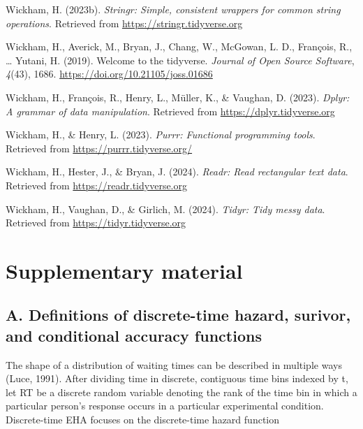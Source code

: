 \documentclass[
  man,floatsintext]{apa6}
\newlength{\cslhangindent}
\newenvironment{CSLReferences}[2] %
 {\begin{list}{}{%
  \setlength{\itemindent}{0pt}
  \setlength{\leftmargin}{0pt}
  \setlength{\parsep}{0pt}
  \ifodd #1
   \setlength{\leftmargin}{\cslhangindent}
   \setlength{\itemindent}{-1\cslhangindent}
  \fi
  \setlength{\itemsep}{#2\baselineskip}}}
 {\end{list}}
\begin{document}
\begin{CSLReferences}{1}{0}
Wickham, H. (2023b). \emph{Stringr: Simple, consistent wrappers for common string operations}. Retrieved from \url{https://stringr.tidyverse.org}

Wickham, H., Averick, M., Bryan, J., Chang, W., McGowan, L. D., François, R., \ldots{} Yutani, H. (2019). Welcome to the {tidyverse}. \emph{Journal of Open Source Software}, \emph{4}(43), 1686. \url{https://doi.org/10.21105/joss.01686}

Wickham, H., François, R., Henry, L., Müller, K., \& Vaughan, D. (2023). \emph{Dplyr: A grammar of data manipulation}. Retrieved from \url{https://dplyr.tidyverse.org}

Wickham, H., \& Henry, L. (2023). \emph{Purrr: Functional programming tools}. Retrieved from \url{https://purrr.tidyverse.org/}

Wickham, H., Hester, J., \& Bryan, J. (2024). \emph{Readr: Read rectangular text data}. Retrieved from \url{https://readr.tidyverse.org}

Wickham, H., Vaughan, D., \& Girlich, M. (2024). \emph{Tidyr: Tidy messy data}. Retrieved from \url{https://tidyr.tidyverse.org}

\end{CSLReferences}

\newpage

\section{Supplementary material}\label{supplementary-material}

\subsection{A. Definitions of discrete-time hazard, surivor, and conditional accuracy functions}\label{a.-definitions-of-discrete-time-hazard-surivor-and-conditional-accuracy-functions}

The shape of a distribution of waiting times can be described in multiple ways (Luce, 1991). After dividing time in discrete, contiguous time bins indexed by t, let RT be a discrete random variable denoting the rank of the time bin in which a particular person's response occurs in a particular experimental condition.
Discrete-time EHA focuses on the discrete-time hazard function
\end{document}
